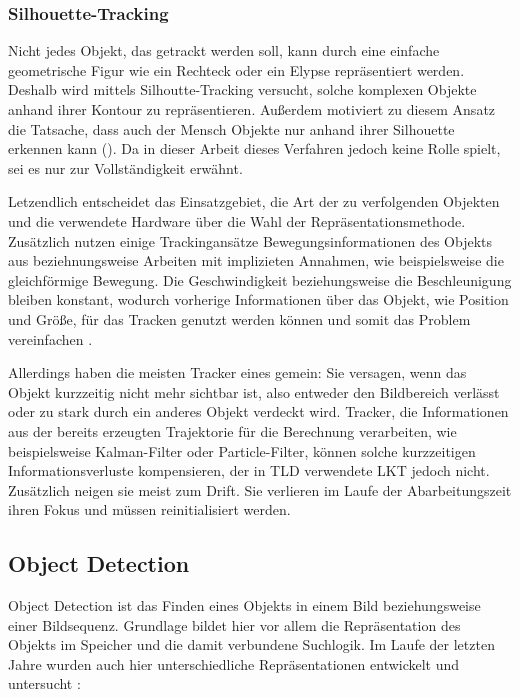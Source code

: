 \subsubsection{Silhouette-Tracking}
Nicht jedes Objekt, das getrackt werden soll, kann durch eine einfache geometrische Figur wie ein Rechteck oder ein Elypse repräsentiert werden. Deshalb wird mittels Silhoutte-Tracking versucht, solche komplexen Objekte anhand ihrer Kontour zu repräsentieren. Außerdem motiviert zu diesem Ansatz die Tatsache, dass auch der Mensch Objekte nur anhand ihrer Silhouette erkennen kann (). Da in dieser Arbeit dieses Verfahren jedoch keine Rolle spielt, sei es nur zur Vollständigkeit erwähnt.

Letzendlich entscheidet das Einsatzgebiet, die Art der zu verfolgenden Objekten und die verwendete Hardware über die Wahl der Repräsentationsmethode. Zusätzlich nutzen einige Trackingansätze Bewegungsinformationen des Objekts aus beziehnungsweise Arbeiten mit implizieten Annahmen, wie beispielsweise die gleichförmige Bewegung. Die Geschwindigkeit beziehungsweise die Beschleunigung bleiben konstant, wodurch vorherige Informationen über das Objekt, wie Position und Größe, für das Tracken genutzt werden können und somit das Problem vereinfachen \cite{OTS}.

Allerdings haben die meisten Tracker eines gemein: Sie versagen, wenn das Objekt kurzzeitig nicht mehr sichtbar ist, also entweder den Bildbereich verlässt oder zu stark durch ein anderes Objekt verdeckt wird. Tracker, die Informationen aus der bereits erzeugten Trajektorie für die Berechnung verarbeiten, wie beispielsweise Kalman-Filter \cite{KAF} oder Particle-Filter\cite{PAF}, können solche kurzzeitigen Informationsverluste kompensieren, der in TLD verwendete LKT jedoch nicht. Zusätzlich neigen sie meist zum Drift. Sie verlieren im Laufe der Abarbeitungszeit ihren Fokus und müssen reinitialisiert werden.

\subsection{Object Detection}
Object Detection ist das Finden eines Objekts in einem Bild beziehungsweise einer Bildsequenz. Grundlage bildet hier vor allem die Repräsentation des Objekts im Speicher und die damit verbundene Suchlogik. Im Laufe der letzten Jahre wurden auch hier unterschiedliche Repräsentationen entwickelt und untersucht \cite{OTS}:


